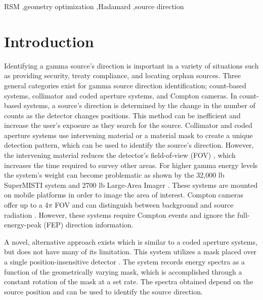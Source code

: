 \documentclass[3p,times]{elsarticle}
\begin{document}
\begin{frontmatter}
\begin{keyword}
RSM \sep geometry optimization \sep Hadamard \sep source direction

\end{keyword}

\end{frontmatter}


\section{Introduction}
\label{intro}
Identifying a gamma source's direction is important in a variety of situations such as providing security, treaty compliance, and locating orphan sources.  
%
Three general categories exist for gamma source direction identification; count-based systems, collimator and coded aperture systems, and Compton cameras.
In count-based systems, a source's direction is determined by the change in the number of counts as the detector changes positions.  This method can 
be inefficient and increase the user's exposure as they search for the source.  Collimator and coded aperture systems 
use intervening material or a material mask to create a unique detection pattern, which can be
used to identify the source's direction.  However, the intervening material reduces
the detector's field-of-view (FOV) \cite{Vetter06}, which increases the time required to survey other areas.  For higher gamma energy levels the system's weight can become 
problematic as shown by the 32,000 lb SuperMISTI system \cite{Hutcheson14} and 2700 lb Large-Area Imager \cite{Ziock06}.  These systems are mounted on mobile platforms in order to image
the area of interest.  Compton cameras offer up to a 4$\pi$ FOV 
\cite{Wahl11} and can distinguish between background and source radiation \cite{Vetter06, Phillips95}.  However,
these systems require Compton events and ignore the full-energy-peak (FEP) 
direction information.

A novel, alternative approach exists which is similar to a coded aperture systems, but does not have many of its limitation.
This system utilizes a mask placed over a single position-insensitive detector \cite{FitzGerald2015}.  
The system records energy spectra as a function of the geometrically varying mask, which is accomplished through a constant rotation of the mask at a set rate. 
The spectra obtained depend on the source position and can be used to identify the source direction.  
\end{document}
